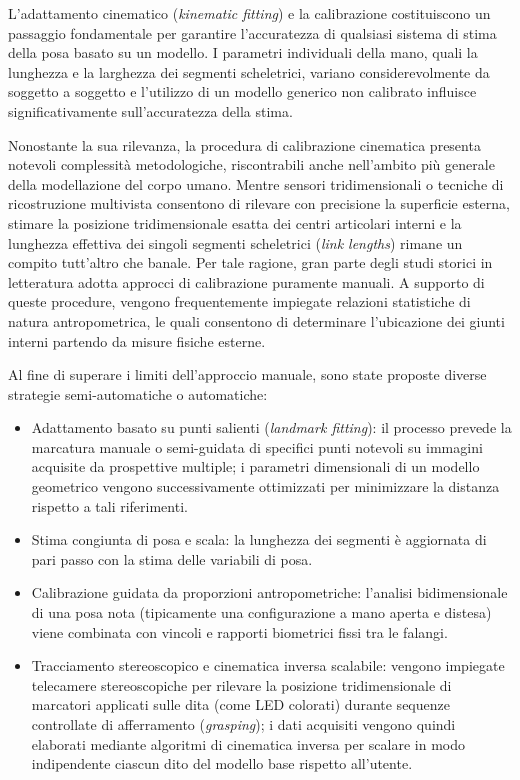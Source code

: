 L'adattamento cinematico (\emph{kinematic fitting}) e la calibrazione costituiscono un passaggio fondamentale per garantire l'accuratezza di qualsiasi sistema di stima della posa basato su un modello. 
I parametri individuali della mano, quali la lunghezza e la larghezza dei segmenti scheletrici, variano considerevolmente da soggetto a soggetto e l'utilizzo di un modello generico non calibrato influisce significativamente sull'accuratezza della stima. 

Nonostante la sua rilevanza, la procedura di calibrazione cinematica presenta notevoli complessità metodologiche, riscontrabili anche nell'ambito più generale della modellazione del corpo umano.
Mentre sensori tridimensionali o tecniche di ricostruzione multivista consentono di rilevare con precisione la superficie esterna, stimare la posizione tridimensionale esatta dei centri articolari interni e la lunghezza effettiva dei singoli segmenti scheletrici (\emph{link lengths}) rimane un compito tutt'altro che banale.
Per tale ragione, gran parte degli studi storici in letteratura adotta approcci di calibrazione puramente manuali.
A supporto di queste procedure, vengono frequentemente impiegate relazioni statistiche di natura antropometrica, le quali consentono di determinare l'ubicazione dei giunti interni partendo da misure fisiche esterne.

Al fine di superare i limiti dell'approccio manuale, sono state proposte diverse strategie semi-automatiche o automatiche:

\begin{itemize}
    \item Adattamento basato su punti salienti (\emph{landmark fitting}):
    il processo prevede la marcatura manuale o semi-guidata di specifici punti notevoli su immagini acquisite da prospettive multiple; 
    i parametri dimensionali di un modello geometrico vengono successivamente ottimizzati per minimizzare la distanza rispetto a tali riferimenti.

    \item Stima congiunta di posa e scala:
    la lunghezza dei segmenti è aggiornata di pari passo con la stima delle variabili di posa.
    
    \item Calibrazione guidata da proporzioni antropometriche:
    l'analisi bidimensionale di una posa nota (tipicamente una configurazione a mano aperta e distesa) viene combinata con vincoli e rapporti biometrici fissi tra le falangi.

    \item Tracciamento stereoscopico e cinematica inversa scalabile:
    vengono impiegate telecamere stereoscopiche per rilevare la posizione tridimensionale di marcatori applicati sulle dita (come LED colorati) durante sequenze controllate di afferramento (\emph{grasping}); 
    i dati acquisiti vengono quindi elaborati mediante algoritmi di cinematica inversa per  scalare in modo indipendente ciascun dito del modello base rispetto all'utente.
\end{itemize}
